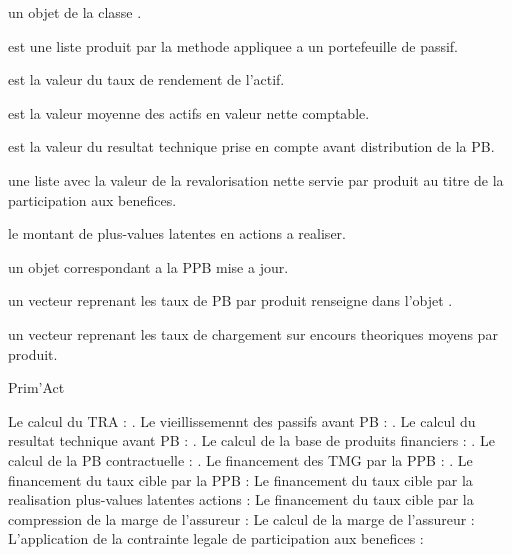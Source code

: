 \documentclass[a4paper]{book}
\begin{document}
%
\begin{Arguments}
\begin{ldescription}
\item[\code{x}] un objet de la classe .

\item[\code{passif\_av\_pb}] est une liste produit par la methode 
appliquee a un portefeuille de passif.

\item[\code{tra}] est la valeur  du taux de rendement de l'actif.

\item[\code{plac\_moy\_vnc}] est la valeur  moyenne des actifs en valeur nette comptable.

\item[\code{result\_tech}] est la valeur  du resultat technique prise en compte avant distribution
de la PB.
\end{ldescription}
\end{Arguments}
%
\begin{Value}
 une liste avec la valeur de la revalorisation nette servie par
produit au titre de la participation aux benefices.

 le montant de plus-values latentes en actions a realiser.

 un objet  correspondant a la PPB mise a jour.

 un vecteur reprenant les taux de PB par produit renseigne dans l'objet .

 un vecteur reprenant les taux de chargement sur encours theoriques moyens
par produit.
\end{Value}
%
\begin{Author}\relax
Prim'Act
\end{Author}
%
\begin{SeeAlso}\relax
Le calcul du TRA : .
Le vieillissemennt des passifs avant PB : .
Le calcul du resultat technique avant PB : .
Le calcul de la base de produits financiers : .
Le calcul de la PB contractuelle : .
Le financement des TMG par la PPB : .
Le financement du taux cible par la PPB : 
Le financement du taux cible par la realisation plus-values latentes actions : 
Le financement du taux cible par la compression de la marge de l'assureur : 
Le calcul de la marge de l'assureur : 
L'application de la contrainte legale de participation aux benefices : 
\end{SeeAlso}
\end{document}
